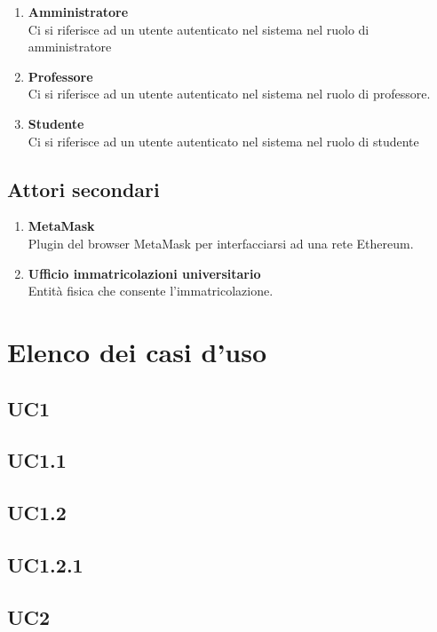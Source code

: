 \documentclass[AnalisiDeiRequisiti.tex]{subfiles}
\begin{document}
\begin{enumerate}
	\item \textbf{Amministratore}\\
	Ci si riferisce ad un utente autenticato nel sistema nel ruolo di amministratore\\
	
	\item \textbf{Professore}\\
	Ci si riferisce ad un utente autenticato nel sistema nel ruolo di professore.\\
	
	\item \textbf{Studente}\\
	Ci si riferisce ad un utente autenticato nel sistema nel ruolo di studente\\	
\end{enumerate}

\subsection{Attori secondari}
\begin{enumerate}
	\item \textbf{MetaMask}\\
	Plugin del browser MetaMask per interfacciarsi ad una rete Ethereum.\\
	
	\item \textbf{Ufficio immatricolazioni universitario}\\
	Entità fisica che consente l'immatricolazione.\\
\end{enumerate}

\section{Elenco dei casi d'uso}
\subsection{UC1}
\subsection{UC1.1}
\subsection{UC1.2}
\subsection{UC1.2.1}
\subsection{UC2}
\end{document}
